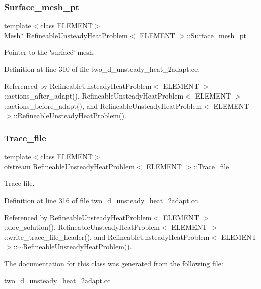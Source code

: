 \subsubsection{\texorpdfstring{Surface\+\_\+mesh\+\_\+pt}{Surface\_mesh\_pt}}
{\footnotesize\ttfamily template$<$class E\+L\+E\+M\+E\+NT$>$ \\
Mesh$\ast$ \hyperlink{classRefineableUnsteadyHeatProblem}{Refineable\+Unsteady\+Heat\+Problem}$<$ E\+L\+E\+M\+E\+NT $>$\+::Surface\+\_\+mesh\+\_\+pt\hspace{0.3cm}{\ttfamily [private]}}



Pointer to the \char`\"{}surface\char`\"{} mesh. 



Definition at line 310 of file two\+\_\+d\+\_\+unsteady\+\_\+heat\+\_\+2adapt.\+cc.



Referenced by Refineable\+Unsteady\+Heat\+Problem$<$ E\+L\+E\+M\+E\+N\+T $>$\+::actions\+\_\+after\+\_\+adapt(), Refineable\+Unsteady\+Heat\+Problem$<$ E\+L\+E\+M\+E\+N\+T $>$\+::actions\+\_\+before\+\_\+adapt(), and Refineable\+Unsteady\+Heat\+Problem$<$ E\+L\+E\+M\+E\+N\+T $>$\+::\+Refineable\+Unsteady\+Heat\+Problem().

\mbox{\label{classRefineableUnsteadyHeatProblem_a8f62ba78fb856d2e07b00254ca7a0e6a}} 
\subsubsection{\texorpdfstring{Trace\+\_\+file}{Trace\_file}}
{\footnotesize\ttfamily template$<$class E\+L\+E\+M\+E\+NT$>$ \\
ofstream \hyperlink{classRefineableUnsteadyHeatProblem}{Refineable\+Unsteady\+Heat\+Problem}$<$ E\+L\+E\+M\+E\+NT $>$\+::Trace\+\_\+file\hspace{0.3cm}{\ttfamily [private]}}



Trace file. 



Definition at line 316 of file two\+\_\+d\+\_\+unsteady\+\_\+heat\+\_\+2adapt.\+cc.



Referenced by Refineable\+Unsteady\+Heat\+Problem$<$ E\+L\+E\+M\+E\+N\+T $>$\+::doc\+\_\+solution(), Refineable\+Unsteady\+Heat\+Problem$<$ E\+L\+E\+M\+E\+N\+T $>$\+::write\+\_\+trace\+\_\+file\+\_\+header(), and Refineable\+Unsteady\+Heat\+Problem$<$ E\+L\+E\+M\+E\+N\+T $>$\+::$\sim$\+Refineable\+Unsteady\+Heat\+Problem().



The documentation for this class was generated from the following file\+:\begin{DoxyCompactItemize}
\item 
\hyperlink{two__d__unsteady__heat__2adapt_8cc}{two\+\_\+d\+\_\+unsteady\+\_\+heat\+\_\+2adapt.\+cc}\end{DoxyCompactItemize}
